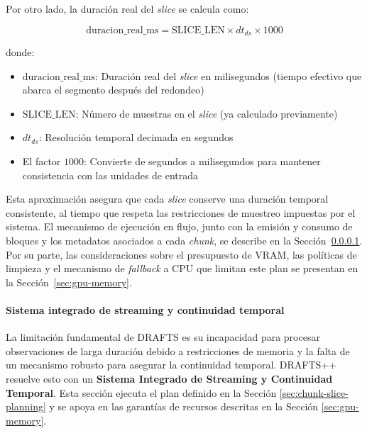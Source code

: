 Por otro lado, la duración real del \emph{slice} se calcula como:

\[
\text{duracion\_real\_ms} = \text{SLICE\_LEN} \times dt_{ds} \times 1000
\]

donde:
\begin{itemize}
    \item $\text{duracion\_real\_ms}$: Duración real del \emph{slice} en milisegundos (tiempo efectivo que abarca el segmento después del redondeo)
    \item $\text{SLICE\_LEN}$: Número de muestras en el \emph{slice} (ya calculado previamente)
    \item $dt_{ds}$: Resolución temporal decimada en segundos
    \item El factor $1000$: Convierte de segundos a milisegundos para mantener consistencia con las unidades de entrada
\end{itemize}

Esta aproximación asegura que cada \emph{slice} conserve una duración temporal consistente, al tiempo que respeta las restricciones de muestreo impuestas por el sistema. El mecanismo de ejecución en flujo, junto con la emisión y consumo de bloques y los metadatos asociados a cada \emph{chunk}, se describe en la Sección~\ref{sec:streaming-continuity}. Por su parte, las consideraciones sobre el presupuesto de VRAM, las políticas de limpieza y el mecanismo de \textit{fallback} a CPU que limitan este plan se presentan en la Sección~\ref{sec:gpu-memory}.

\paragraph{Sistema integrado de streaming y continuidad temporal}\label{sec:streaming-continuity}

La limitación fundamental de DRAFTS es su incapacidad para procesar observaciones de larga duración debido a restricciones de memoria y la falta de un mecanismo robusto para asegurar la continuidad temporal. DRAFTS++ resuelve esto con un \textbf{Sistema Integrado de Streaming y Continuidad Temporal}. Esta sección ejecuta el plan definido en la Sección \ref{sec:chunk-slice-planning} y se apoya en las garantías de recursos descritas en la Sección \ref{sec:gpu-memory}.

